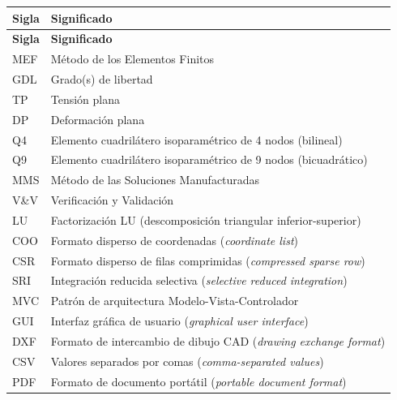 \begin{longtable}{@{}p{2.4cm}p{11.4cm}@{}}
\toprule
\textbf{Sigla} & \textbf{Significado} \\
\midrule
\endfirsthead
\toprule
\textbf{Sigla} & \textbf{Significado} \\
\midrule
\endhead
\bottomrule
\endfoot
MEF & Método de los Elementos Finitos \\
GDL & Grado(s) de libertad \\
TP & Tensión plana \\
DP & Deformación plana \\
Q4 & Elemento cuadrilátero isoparamétrico de 4 nodos (bilineal) \\
Q9 & Elemento cuadrilátero isoparamétrico de 9 nodos (bicuadrático) \\
MMS & Método de las Soluciones Manufacturadas \\
V\&V & Verificación y Validación \\
LU & Factorización LU (descomposición triangular inferior-superior) \\
COO & Formato disperso de coordenadas (\emph{coordinate list}) \\
CSR & Formato disperso de filas comprimidas (\emph{compressed sparse row}) \\
SRI & Integración reducida selectiva (\emph{selective reduced integration}) \\
MVC & Patrón de arquitectura Modelo-Vista-Controlador \\
GUI & Interfaz gráfica de usuario (\emph{graphical user interface}) \\
DXF & Formato de intercambio de dibujo CAD (\emph{drawing exchange format}) \\
CSV & Valores separados por comas (\emph{comma-separated values}) \\
PDF & Formato de documento portátil (\emph{portable document format}) \\
\end{longtable}
\renewcommand{\arraystretch}{1.0}

\setcounter{table}{0}
